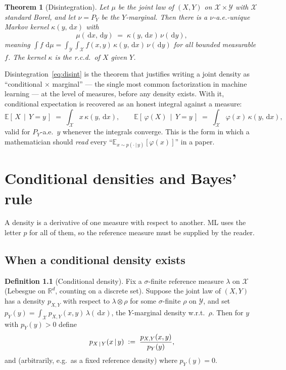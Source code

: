 \documentclass[11pt,oneside]{report}
\theoremstyle{plain}
\newtheorem{theorem}{Theorem}[chapter]
\theoremstyle{definition}
\newtheorem{definition}[theorem]{Definition}
\theoremstyle{remark}
\newcommand{\R}{\mathbb{R}}
\newcommand{\E}{\mathbb{E}}
\newcommand{\dd}{\,\mathrm{d}}
\newcommand{\Xcal}{\mathcal{X}}
\newcommand{\Ycal}{\mathcal{Y}}
\newcommand{\defeq}{\vcentcolon=}
\newcommand{\given}{\,\vert\,}
\newcommand{\cE}[2]{\E\!\left[\,#1 \,\middle|\, #2\,\right]}
\numberwithin{equation}{chapter}
\begin{document}
\begin{theorem}[Disintegration]\label{thm:disintegration}
Let $\mu$ be the joint law of $(X,Y)$ on $\Xcal\times\Ycal$ with $\Xcal$
standard Borel, and let $\nu=P_Y$ be the $Y$-marginal. Then there is a
$\nu$-a.e.-unique Markov kernel $\kappa(y,\dd x)$ with
\begin{equation}\label{eq:disint}
  \mu(\dd x,\dd y)\;=\;\kappa(y,\dd x)\,\nu(\dd y),
\end{equation}
meaning $\displaystyle\int f\,\dd\mu=\int_\Ycal\!\int_\Xcal
f(x,y)\,\kappa(y,\dd x)\,\nu(\dd y)$ for all bounded measurable $f$. The
kernel $\kappa$ is the r.c.d.\ of $X$ given $Y$.
\end{theorem}

Disintegration~\eqref{eq:disint} is the theorem that justifies writing a
joint density as ``conditional $\times$ marginal'' --- the single most
common factorization in machine learning --- at the level of measures,
before any density exists. With it, conditional expectation is recovered as
an honest integral against a measure:
\begin{equation}\label{eq:ce-via-rcd}
  \cE{X}{Y=y}\;=\;\int_\Xcal x\,\kappa(y,\dd x),
  \qquad
  \cE{\varphi(X)}{Y=y}\;=\;\int_\Xcal \varphi(x)\,\kappa(y,\dd x),
\end{equation}
valid for $P_Y$-a.e.\ $y$ whenever the integrals converge. This is the form
in which a mathematician should \emph{read} every ``$\E_{x\sim p(\cdot\given
y)}[\varphi(x)]$'' in a paper.

\chapter{Conditional densities and Bayes' rule}\label{ch:cond-density}

A density is a derivative of one measure with respect to another. ML uses
the letter $p$ for all of them, so the reference measure must be supplied
by the reader.

\section{When a conditional density exists}

\begin{definition}[Conditional density]\label{def:cond-density}
Fix a $\sigma$-finite reference measure $\lambda$ on $\Xcal$ (Lebesgue on
$\R^d$, counting on a discrete set). Suppose the joint law of $(X,Y)$ has a
density $p_{X,Y}$ with respect to $\lambda\otimes\rho$ for some
$\sigma$-finite $\rho$ on $\Ycal$, and set
$p_Y(y)=\int_\Xcal p_{X,Y}(x,y)\,\lambda(\dd x)$, the $Y$-marginal density
w.r.t.\ $\rho$. Then for $y$ with $p_Y(y)>0$ define
\begin{equation}\label{eq:cond-density}
  p_{X\given Y}(x\given y)\;\defeq\;\frac{p_{X,Y}(x,y)}{p_Y(y)} ,
\end{equation}
and (arbitrarily, e.g.\ as a fixed reference density) where $p_Y(y)=0$.
\end{definition}
\end{document}
